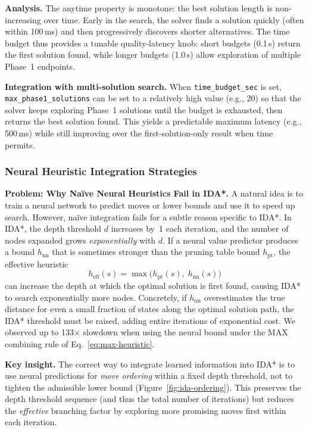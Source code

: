 \documentclass[conference]{IEEEtran}
\begin{document}
\textbf{Analysis.} The anytime property is monotone: the best solution length is non-increasing over time. Early in the search, the solver finds a solution quickly (often within 100\,ms) and then progressively discovers shorter alternatives. The time budget thus provides a tunable quality-latency knob: short budgets (0.1\,s) return the first solution found, while longer budgets (1.0\,s) allow exploration of multiple Phase~1 endpoints.

\textbf{Integration with multi-solution search.} When \texttt{time\_budget\_sec} is set, \texttt{max\_phase1\_solutions} can be set to a relatively high value (e.g., 20) so that the solver keeps exploring Phase~1 solutions until the budget is exhausted, then returns the best solution found. This yields a predictable maximum latency (e.g., 500\,ms) while still improving over the first-solution-only result when time permits.

\subsubsection{Neural Heuristic Integration Strategies}
\label{sec:neural-strategies}

\textbf{Problem: Why Na\"ive Neural Heuristics Fail in IDA*.}
A natural idea is to train a neural network to predict moves or lower bounds and use it to speed up search. However, na\"ive integration fails for a subtle reason specific to IDA*. In IDA*, the depth threshold $d$ increases by~1 each iteration, and the number of nodes expanded grows \emph{exponentially} with $d$. If a neural value predictor produces a bound $h_{\mathrm{nn}}$ that is sometimes stronger than the pruning table bound $h_{\mathrm{pt}}$, the effective heuristic
\begin{equation}
h_{\text{eff}}(s) = \max\bigl(h_{\mathrm{pt}}(s),\; h_{\mathrm{nn}}(s)\bigr)
\label{eq:max-heuristic}
\end{equation}
can increase the depth at which the optimal solution is first found, causing IDA* to search exponentially more nodes. Concretely, if $h_{\mathrm{nn}}$ overestimates the true distance for even a small fraction of states along the optimal solution path, the IDA* threshold must be raised, adding entire iterations of exponential cost. We observed up to 133$\times$ slowdown when using the neural bound under the MAX combining rule of Eq.~\eqref{eq:max-heuristic}.

\textbf{Key insight.} The correct way to integrate learned information into IDA* is to use neural predictions for \emph{move ordering} within a fixed depth threshold, not to tighten the admissible lower bound (Figure~\ref{fig:ida-ordering}). This preserves the depth threshold sequence (and thus the total number of iterations) but reduces the \emph{effective} branching factor by exploring more promising moves first within each iteration.
\end{document}
